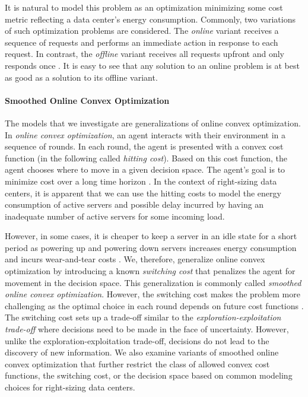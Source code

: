It is natural to model this problem as an optimization minimizing some cost metric reflecting a data center's energy consumption. Commonly, two variations of such optimization problems are considered. The \emph{online} variant receives a sequence of requests and performs an immediate action in response to each request. In contrast, the \emph{offline} variant receives all requests upfront and only responds once \cite{Karp1992}. It is easy to see that any solution to an online problem is at best as good as a solution to its offline variant.

\paragraph{Smoothed Online Convex Optimization} The models that we investigate are generalizations of online convex optimization. In \emph{online convex optimization}, an agent interacts with their environment in a sequence of rounds. In each round, the agent is presented with a convex cost function (in the following called \emph{hitting cost}). Based on this cost function, the agent chooses where to move in a given decision space. The agent's goal is to minimize cost over a long time horizon \cite{Hazan2019}. In the context of right-sizing data centers, it is apparent that we can use the hitting costs to model the energy consumption of active servers and possible delay incurred by having an inadequate number of active servers for some incoming load.

However, in some cases, it is cheaper to keep a server in an idle state for a short period as powering up and powering down servers increases energy consumption and incurs wear-and-tear costs \cite{Lin2011}. We, therefore, generalize online convex optimization by introducing a known \emph{switching cost} that penalizes the agent for movement in the decision space. This generalization is commonly called \emph{smoothed online convex optimization}. However, the switching cost makes the problem more challenging as the optimal choice in each round depends on future cost functions \cite{Chen2015}. The switching cost sets up a trade-off similar to the \emph{exploration-exploitation trade-off} where decisions need to be made in the face of uncertainty. However, unlike the exploration-exploitation trade-off, decisions do not lead to the discovery of new information. We also examine variants of smoothed online convex optimization that further restrict the class of allowed convex cost functions, the switching cost, or the decision space based on common modeling choices for right-sizing data centers.

